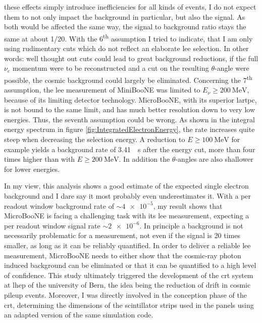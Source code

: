 these effects simply introduce inefficiencies for all kinds of events, I do not expect them to not only impact the background in particular, but also the signal. As both would be affected the same way, the signal to background ratio stays the same at about \num{1/20}. With the 6\textsuperscript{th} assumption I tried to indicate, that I am only using rudimentary cuts which do not reflect an elaborate \gls{lee} selection. In other words: well thought out cuts could lead to great background reductions, \eg if the full $\nu_e$ momentum were to be reconstructed and a cut on the resulting $\theta$-angle were possible, the cosmic background could largely be eliminated. Concerning the 7\textsuperscript{th} assumption, the \gls{lee} measurement of MiniBooNE was limited to $E_\nu \geq \SI{200}{\mega\electronvolt}$, because of its limiting detector technology. MicroBooNE, with its superior \gls{lartpc}, is not bound to the same limit, and has much better resolution down to very low energies. Thus, the seventh assumption could be wrong. As shown in the integral energy spectrum in figure \ref{fig:IntegratedElectronEnergy}, the rate increases quite steep when decreasing the selection energy. A reduction to $E \geq \SI{100}{\mega\electronvolt}$ for example yields a background rate of \SI{3.41}{\per\second} after the energy cut, more than four times higher than with $E \geq \SI{200}{\mega\electronvolt}$. In addition the $\theta$-angles are also shallower for lower energies.

In my view, this analysis shows a good estimate of the expected single electron background and I dare say it most probably even underestimates it. With a per readout window background rate of $\sim\num{4e-5}$, my result shows that MicroBooNE is facing a challenging task with its \gls{lee} measurement, expecting a per readout window signal rate $\sim\num{2e-6}$. In principle a background is not necessarily problematic for a measurement, not even if the signal is \num{20} times smaller, as long as it can be reliably quantified. In order to deliver a reliable \gls{lee} measurement, MicroBooNE needs to either show that the cosmic-ray photon induced background can be eliminated or that it can be quantified to a high level of confidence. This study ultimately triggered the development of the \gls{crt} system at \gls{lhep} of the university of Bern, the idea being the reduction of drift in cosmic pileup events. Moreover, I was directly involved in the conception phase of the \gls{crt}, determining the dimensions of the scintillator strips used in the panels using an adapted version of the same simulation code.

